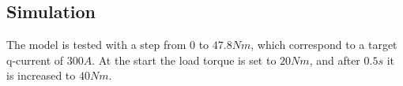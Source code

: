 \subsection{Simulation}
The model is tested with a step from $0$ to $47.8 Nm$, which correspond to a target q-current of $300 A $. At the start the load torque is set to $20 Nm$, and after $0.5 s$ it is increased to $40 Nm$. 